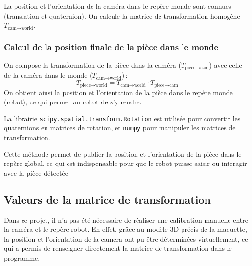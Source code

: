 La position et l’orientation de la caméra dans le repère monde sont connues (translation et quaternion). On calcule la matrice de transformation homogène $T_{\text{cam} \to \text{world}}$.

\subsubsection{Calcul de la position finale de la pièce dans le monde}

On compose la transformation de la pièce dans la caméra ($T_{\text{piece} \to \text{cam}}$) avec celle de la caméra dans le monde ($T_{\text{cam} \to \text{world}}$) :
\[
    T_{\text{piece} \to \text{world}} = T_{\text{cam} \to \text{world}} \cdot T_{\text{piece} \to \text{cam}}
\]
On obtient ainsi la position et l’orientation de la pièce dans le repère monde (robot), ce qui permet au robot de s’y rendre.

La librairie \texttt{scipy.spatial.transform.Rotation} est utilisée pour convertir les quaternions en matrices de rotation, et \texttt{numpy} pour manipuler les matrices de transformation.

Cette méthode permet de publier la position et l'orientation de la pièce dans le repère global, ce qui est indispensable pour que le robot puisse saisir ou interagir avec la pièce détectée.

\subsection{Valeurs de la matrice de transformation}

Dans ce projet, il n'a pas été nécessaire de réaliser une calibration manuelle entre la caméra et le repère robot. En effet, grâce au modèle 3D précis de la maquette, la position et l'orientation de la caméra ont pu être déterminées virtuellement, ce qui a permis de renseigner directement la matrice de transformation dans le programme.

